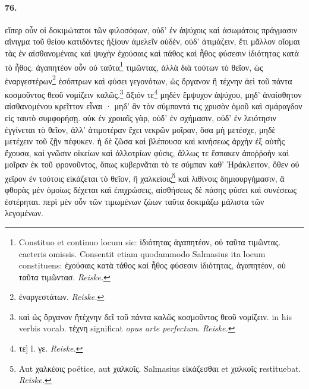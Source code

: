 \documentclass[a4paper, 11pt, oneside, polutonikogreek, german, landscape]{article}
\begin{document}
\paragraph{76.}
εἴπερ οὖν οἱ δοκιμώτατοι τῶν φιλοσόφων, οὐδ' ἐν ἀψύχοις καὶ ἀσωμάτοις πράγμασιν αἴνιγμα τοῦ θείου κατιδόντες ἠξίουν ἀμελεῖν οὐδὲν, οὐδ' ἀτιμάζειν, ἔτι μᾶλλον οἴομαι τὰς ἐν αἰσθανομέναις καὶ ψυχὴν ἐχούσαις καὶ πάθος καὶ ἦθος φύσεσιν ἰδιότητας κατὰ τὸ ἦθος. ἀγαπητέον οὖν οὐ ταῦτα\footnote{Constituo et continuo locum sic: ἰδιότητας ἀγαπητέον, οὐ ταῦτα τιμῶντας. caeteris omissis. Consentit etiam quodammodo Salmasius ita locum constituens: ἐχούσαις κατὰ τάθος καὶ ἦθος φύσεσιν ἰδιότητας, ἀγαπητέον, οὐ ταῦτα τιμῶντασ. \emph{Reiske.}} τιμῶντας, ἀλλὰ διὰ τούτων τὸ θεῖον, ὡς ἐναργεστέρων\footnote{ἐναργεστάτων. \emph{Reiske.}} ἐσόπτρων καὶ φύσει γεγονότων, ὡς ὄργανον ἢ τέχνην ἀεὶ τοῦ πάντα κοσμοῦντος θεοῦ νομίζειν καλῶς.\footnote{καὶ ὡς ὂργανον ἢτέχνην δεῖ τοῦ πάντα καλῶς κοσμοῦντος θεοῦ νομίζειν. in his verbis vocab. τέχνη significat \emph{opus arte perfectum}. \emph{Reiske.}} ἄξιόν τε\footnote{τε] l. γε. \emph{Reiske.}} μηδὲν ἔμψυχον ἀψύχου, μηδ' ἀναίσθητον αἰσθανομένου κρεῖττον εἶναι · μηδ' ἂν τὸν σύμπαντά τις χρυσὸν ὁμοῦ καὶ σμάραγδον εἰς ταυτὸ συμφορήσῃ. οὐκ ἐν χροιαῖς γὰρ, οὐδ' ἐν σχήμασιν, οὐδ' ἐν λειότησιν ἐγγίνεται τὸ θεῖον, ἀλλ' ἀτιμοτέραν ἔχει νεκρῶν μοῖραν, ὅσα μὴ μετέσχε, μηδὲ μετέχειν τοῦ ζῇν πέφυκεν. ἡ δὲ ζῶσα καὶ βλέπουσα καὶ κινήσεως ἀρχὴν ἐξ αὑτῆς ἔχουσα, καὶ γνῶσιν οἰκείων καὶ ἀλλοτρίων φύσις, ἄλλως τε ἔσπακεν ἀποῤῥοὴν καὶ μοῖραν ἐκ τοῦ φρονοῦντος, ὅπως κυβερνᾶται τὸ τε σύμπαν καθ' Ἡράκλειτον, ὅθεν οὐ χεῖρον ἐν τούτοις εἰκάζεται τὸ θεῖον, ἢ χαλκείοις\footnote{Aut χαλκέοις poëtice, aut χαλκοῖς. Salmasius εἰκάζεσθαι et χαλκοῖς restituebat. \emph{Reiske.}} καὶ λιθίνοις δημιουργήμασιν, ἃ φθορὰς μὲν ὁμοίως δέχεται καὶ ἐπιχρώσεις, αἰσθήσεως δὲ πάσης φύσει καὶ συνέσεως ἐστέρηται. περὶ μὲν οὖν τῶν τιμωμένων ζώων ταῦτα δοκιμάζω μάλιστα τῶν λεγομένων.
\end{document}
